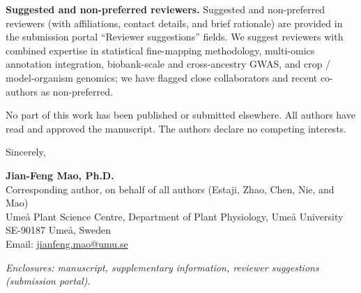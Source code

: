 \documentclass[11pt,a4paper]{article}
\begin{document}
\textbf{Suggested and non-preferred reviewers.}
Suggested and non-preferred reviewers (with affiliations, contact details, and brief rationale)
are provided in the submission portal ``Reviewer suggestions'' fields. We suggest reviewers
with combined expertise in statistical fine-mapping methodology, multi-omics annotation
integration, biobank-scale and cross-ancestry GWAS, and crop / model-organism genomics; we
have flagged close collaborators and recent co-authors as non-preferred.

No part of this work has been published or submitted elsewhere. All authors have read and
approved the manuscript. The authors declare no competing interests.

\vspace{0.6em}

Sincerely,

\vspace{1.4em}

\textbf{Jian-Feng Mao, Ph.D.}\\
Corresponding author, on behalf of all authors (Estaji, Zhao, Chen, Nie, and Mao)\\
Ume\aa{} Plant Science Centre, Department of Plant Physiology, Ume\aa{} University\\
SE-90187 Ume\aa{}, Sweden\\
Email: \href{mailto:jianfeng.mao@umu.se}{jianfeng.mao@umu.se}

\vspace{1em}

\textit{Enclosures: manuscript, supplementary information, reviewer suggestions (submission portal).}
\end{document}
